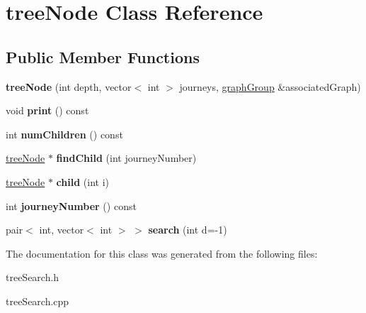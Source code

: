 \hypertarget{classtreeNode}{
\section{treeNode Class Reference}
\label{classtreeNode}
}
\subsection*{Public Member Functions}
\begin{DoxyCompactItemize}
\item 
\hypertarget{classtreeNode_ac56d503fda849c9f4d3673f75786f8df}{
{\bfseries treeNode} (int depth, vector$<$ int $>$ journeys, \hyperlink{classgraphGroup}{graphGroup} \&associatedGraph)}
\label{classtreeNode_ac56d503fda849c9f4d3673f75786f8df}

\item 
\hypertarget{classtreeNode_ab7ffb04cdd8573bbfabce708d431d0e0}{
void {\bfseries print} () const }
\label{classtreeNode_ab7ffb04cdd8573bbfabce708d431d0e0}

\item 
\hypertarget{classtreeNode_a60d07c382d80b707e211544eb7b09d6d}{
int {\bfseries numChildren} () const }
\label{classtreeNode_a60d07c382d80b707e211544eb7b09d6d}

\item 
\hypertarget{classtreeNode_a26c946d40954228fe720c2f85bb65dc4}{
\hyperlink{classtreeNode}{treeNode} $\ast$ {\bfseries findChild} (int journeyNumber)}
\label{classtreeNode_a26c946d40954228fe720c2f85bb65dc4}

\item 
\hypertarget{classtreeNode_a1ff710c92168548ad0a1a7110413beea}{
\hyperlink{classtreeNode}{treeNode} $\ast$ {\bfseries child} (int i)}
\label{classtreeNode_a1ff710c92168548ad0a1a7110413beea}

\item 
\hypertarget{classtreeNode_ad0f47379728a1abd0ab6402215e815c4}{
int {\bfseries journeyNumber} () const }
\label{classtreeNode_ad0f47379728a1abd0ab6402215e815c4}

\item 
\hypertarget{classtreeNode_ae317498057c69830c6ec3f49f185aa37}{
pair$<$ int, vector$<$ int $>$ $>$ {\bfseries search} (int d=-\/1)}
\label{classtreeNode_ae317498057c69830c6ec3f49f185aa37}

\end{DoxyCompactItemize}


The documentation for this class was generated from the following files:\begin{DoxyCompactItemize}
\item 
treeSearch.h\item 
treeSearch.cpp\end{DoxyCompactItemize}
